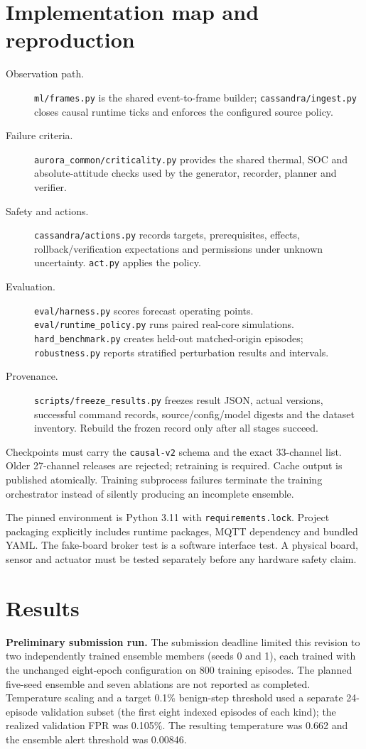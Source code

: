 \documentclass[10pt,a4paper,twocolumn]{article}
\begin{document}
\section{Implementation map and reproduction}
\begin{description}
\item[Observation path.] \texttt{ml/frames.py} is the shared event-to-frame builder; \texttt{cassandra/ingest.py} closes causal runtime ticks and enforces the configured source policy.
\item[Failure criteria.] \texttt{aurora\_common/criticality.py} provides the shared thermal, SOC and absolute-attitude checks used by the generator, recorder, planner and verifier.
\item[Safety and actions.] \texttt{cassandra/actions.py} records targets, prerequisites, effects, rollback/verification expectations and permissions under unknown uncertainty. \texttt{act.py} applies the policy.
\item[Evaluation.] \texttt{eval/harness.py} scores forecast operating points. \texttt{eval/runtime\_policy.py} runs paired real-core simulations. \texttt{hard\_benchmark.py} creates held-out matched-origin episodes; \texttt{robustness.py} reports stratified perturbation results and intervals.
\item[Provenance.] \texttt{scripts/freeze\_results.py} freezes result JSON, actual versions, successful command records, source/config/model digests and the dataset inventory. Rebuild the frozen record only after all stages succeed.
\end{description}

Checkpoints must carry the \texttt{causal-v2} schema and the exact 33-channel list. Older 27-channel releases are rejected; retraining is required. Cache output is published atomically. Training subprocess failures terminate the training orchestrator instead of silently producing an incomplete ensemble.

The pinned environment is Python 3.11 with \texttt{requirements.lock}. Project packaging explicitly includes runtime packages, MQTT dependency and bundled YAML. The fake-board broker test is a software interface test. A physical board, sensor and actuator must be tested separately before any hardware safety claim.

\section{Results}
\textbf{Preliminary submission run.} The submission deadline limited this revision to two independently trained ensemble members (seeds 0 and 1), each trained with the unchanged eight-epoch configuration on 800 training episodes. The planned five-seed ensemble and seven ablations are not reported as completed. Temperature scaling and a target 0.1\% benign-step threshold used a separate 24-episode validation subset (the first eight indexed episodes of each kind); the realized validation FPR was 0.105\%. The resulting temperature was 0.662 and the ensemble alert threshold was 0.00846.
\end{document}
